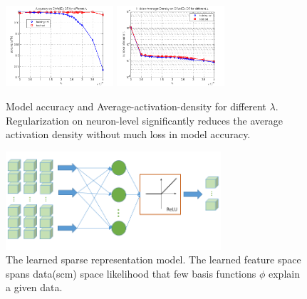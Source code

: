 \begin{figure}
\includegraphics[width=4cm,height=3cm]{figure/Accuracy_on_SWellEx_S5_for_different_lambda}
\includegraphics[width=4cm,height=3cm]{figure/Hidden_Average_Density_on_SWellEx_S5_for_different_lambda}
\caption{Model accuracy and Average-activation-density for different $\lambda $.  Regularization on neuron-level
significantly reduces the average activation density without much loss in model accuracy.}
\end{figure}




\begin{figure}
\includegraphics[width=8cm]{figure/sparse_represention_model}
\caption{The learned sparse representation model. The learned feature space spans data(scm) space likelihood that few basis functions $\phi$ explain a given data.}
\end{figure}

